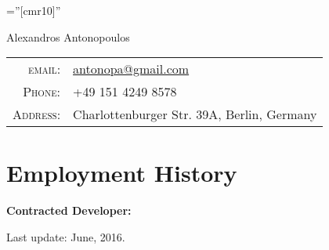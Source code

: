 \documentclass[a4paper,10pt]{article}
\newenvironment{contract_work}
{
    \renewcommand\descriptionlabel[1]{\hspace{\labelsep}{##1,}}

\begin{description}[leftmargin=0cm, labelwidth=0cm, labelsep=0.1cm]
}
{\end{description} }
\begin{document}
\pagestyle{fancyplain}
\renewcommand{\headrulewidth}{0.0pt}
\lhead{}
\chead{}
\rhead{}
\lfoot{}
\cfoot{}
\font\fb=''[cmr10]'' %

\par{\centering
        {\Huge Alexandros Antonopoulos
    }\bigskip\par}

\begin{tabular}{rl}
    \textsc{email:}     & \href{mailto:antonopa@gmail.com}{antonopa@gmail.com} \\
    \textsc{Phone:}     & +49 151 4249 8578\\
    \textsc{Address:}   & Charlottenburger Str. 39A, Berlin, Germany
\end{tabular}

\section{Employment History}
\begin{description}
  
  
  
  
  \item \textbf{Contracted Developer:}
  \begin{contract_work}
    
    
  \end{contract_work}
  
\end{description}





%


\vfill \hfill Last update: June, 2016.
\end{document}
